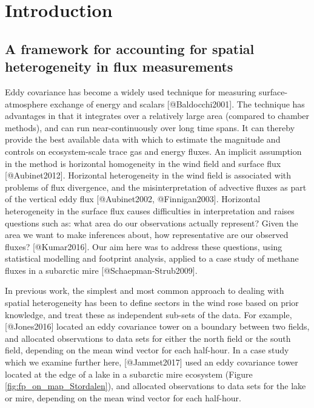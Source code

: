 \section{Introduction}\label{introduction}

\subsection{A framework for accounting for spatial heterogeneity in flux
measurements}\label{a-framework-for-accounting-for-spatial-heterogeneity-in-flux-measurements}

Eddy covariance has become a widely used technique for measuring surface-atmosphere exchange of energy and scalars [@Baldocchi2001]. 
The technique has advantages in that it integrates over a relatively large area (compared to chamber methods), and can run near-continuously over long time spans. It can thereby provide the best available data with which to estimate the magnitude and controls on ecosystem-scale trace gas and energy fluxes. An implicit assumption in the method is horizontal homogeneity in the wind field and surface flux [@Aubinet2012]. Horizontal heterogeneity in the wind field is associated with problems of flux divergence, and the misinterpretation of advective fluxes as part of the vertical eddy flux [@Aubinet2002, @Finnigan2003]. Horizontal heterogeneity in the surface flux causes difficulties in interpretation and raises questions such as: what area do our observations actually represent? Given the area we want to make inferences about, how representative are our observed fluxes? [@Kumar2016].  Our aim here was to address these questions, using statistical modelling and footprint analysis, applied to a case study of methane fluxes in a subarctic mire [@Schaepman-Strub2009].

In previous work, the simplest and most common approach to dealing with spatial heterogeneity has been to define sectors in the wind rose based on prior knowledge, and treat these as independent sub-sets of the data. For example, [@Jones2016] located an eddy covariance tower on a boundary between two fields, and allocated observations to data sets for either the north field or the south field, depending on the mean wind vector for each half-hour. In a case study which we examine further here, [@Jammet2017] used an eddy covariance tower located at the edge of a lake in a subarctic mire ecosystem (Figure \ref{fig:fp_on_map_Stordalen}), and allocated observations to data sets for the lake or mire, depending on the mean wind vector for each half-hour. 

